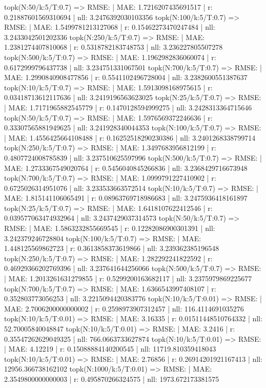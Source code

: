 topk(N:50/k:5/T:0.7) => RMSE: | MAE: 1.7216207435691517 | r: 0.21887601569310694 | nll: 3.2476392030103356
topk(N:100/k:5/T:0.7) => RMSE: | MAE: 1.5499781213127068 | r: 0.15462273470247484 | nll: 3.2433042501202336
topk(N:250/k:5/T:0.7) => RMSE: | MAE: 1.2381274407810068 | r: 0.5318782183748753 | nll: 3.236227805507278
topk(N:500/k:5/T:0.7) => RMSE: | MAE: 1.1962982836060074 | r: 0.6172999796437738 | nll: 3.234751331067501
topk(N:700/k:5/T:0.7) => RMSE: | MAE: 1.2990840908477856 | r: 0.5541102496728004 | nll: 3.2382600551387637
topk(N:10/k:5/T:0.7) => RMSE: | MAE: 1.5913098168975615 | r: 0.03418713612117636 | nll: 3.2419196563623025
topk(N:25/k:5/T:0.7) => RMSE: | MAE: 1.7171965882545779 | r: 0.1470128594999275 | nll: 3.2428313364715646
topk(N:50/k:5/T:0.7) => RMSE: | MAE: 1.5976569372246636 | r: 0.33307565881949625 | nll: 3.241928340044353
topk(N:100/k:5/T:0.7) => RMSE: | MAE: 1.4556425664108488 | r: 0.16252518290230386 | nll: 3.2401268338799714
topk(N:250/k:5/T:0.7) => RMSE: | MAE: 1.3497683956812199 | r: 0.4807724008785839 | nll: 3.237510625597996
topk(N:500/k:5/T:0.7) => RMSE: | MAE: 1.2733367549020764 | r: 0.5456040845266836 | nll: 3.2368429716673948
topk(N:700/k:5/T:0.7) => RMSE: | MAE: 1.0999791227410902 | r: 0.6725026314951076 | nll: 3.233533663572514
topk(N:10/k:5/T:0.7) => RMSE: | MAE: 1.815141106065491 | r: 0.08963769718986683 | nll: 3.2475936418161897
topk(N:25/k:5/T:0.7) => RMSE: | MAE: 1.6418107622412546 | r: 0.039577063474932964 | nll: 3.2437429037314573
topk(N:50/k:5/T:0.7) => RMSE: | MAE: 1.5863232855669545 | r: 0.12282086900301391 | nll: 3.242379246728804
topk(N:100/k:5/T:0.7) => RMSE: | MAE: 1.448125569862723 | r: 0.3613858373619866 | nll: 3.239362385196548
topk(N:250/k:5/T:0.7) => RMSE: | MAE: 1.282292241822592 | r: 0.46929366202769396 | nll: 3.237641644256066
topk(N:500/k:5/T:0.7) => RMSE: | MAE: 1.2013261631279855 | r: 0.5299200163682117 | nll: 3.2375979869225677
topk(N:700/k:5/T:0.7) => RMSE: | MAE: 1.6366543997408107 | r: 0.352803773056253 | nll: 3.2215094420383776
topk(N:10/k:5/T:0.01) => RMSE: | MAE: 2.7006200000000002 | r: 0.2598973907312457 | nll: 116.4114691035276
topk(N:10/k:5/T:0.01) => RMSE: | MAE: 3.16335 | r: 0.01511448510764332 | nll: 52.70005840048847
topk(N:10/k:5/T:0.01) => RMSE: | MAE: 3.2416 | r: 0.35547262629049325 | nll: 766.0663733627874
topk(N:10/k:5/T:0.01) => RMSE: | MAE: 4.12219 | r: 0.15088884140200545 | nll: 11719.810359418043
topk(N:10/k:5/T:0.01) => RMSE: | MAE: 2.76856 | r: 0.26914201921167413 | nll: 12956.366738162102
topk(N:1000/k:5/T:0.01) => RMSE: | MAE: 2.3549800000000003 | r: 0.495870266324575 | nll: 1973.672173381575
